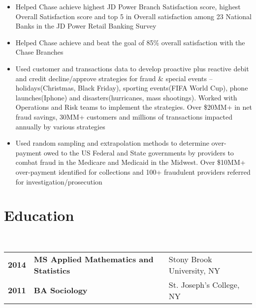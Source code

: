 \documentclass[a4paper,11pt]{article}
\begin{document}
\begin{itemize}
\item Helped Chase achieve highest JD Power Branch Satisfaction score, highest Overall Satisfaction score and top 5 in Overall satisfaction among 23 National Banks in the JD Power Retail Banking Survey
\item Helped Chase achieve and beat the goal of 85\% overall satisfaction with the Chase Branches
\item Used customer and transactions data to develop proactive plus reactive debit and credit decline/approve strategies for fraud \& special events – holidays(Christmas, Black Friday), sporting events(FIFA World Cup), phone launches(Iphone) and disasters(hurricanes, mass shootings). Worked with Operations and Risk teams to implement the strategies. Over \$20MM+ in net fraud savings, 30MM+ customers and millions of transactions impacted annually by various strategies
\item Used random sampling and extrapolation methods to determine over-payment owed to the US Federal and State governments by providers to combat fraud in the Medicare and Medicaid in the Midwest. Over \$10MM+ over-payment identified for collections and 100+ fraudulent providers referred for investigation/prosecution
\end{itemize}


\section{Education}

~\begin{tabular}{lll}
\textbf{2014} &\textbf{MS Applied Mathematics and Statistics} & Stony Brook University, NY\\
\textbf{2011} &\textbf{ BA Sociology} & St. Joseph's College, NY
\end{tabular}

\enlargethispage*{0.9cm}

\setlength{\bibitemsep}{1.8pt}
\end{document}
